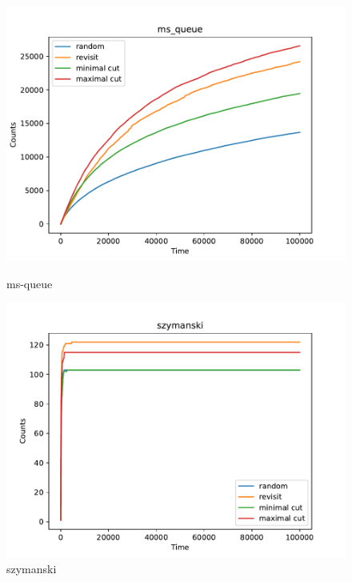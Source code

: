 \begin{figure}[h!]
	\begin{minipage}{0.45\textwidth}
		\centering
		\includegraphics[width=\textwidth]{figure/genmc/ms_queue.pdf}
		\caption{ms-queue}
		\label{genmc:ms_queue}
	\end{minipage}
	\hfill
	\begin{minipage}{0.45\textwidth}
		\centering
		\includegraphics[width=\textwidth]{figure/genmc/szymanski.pdf}
		\caption{szymanski}
		\label{genmc:szymanski}
	\end{minipage}


\end{figure}
